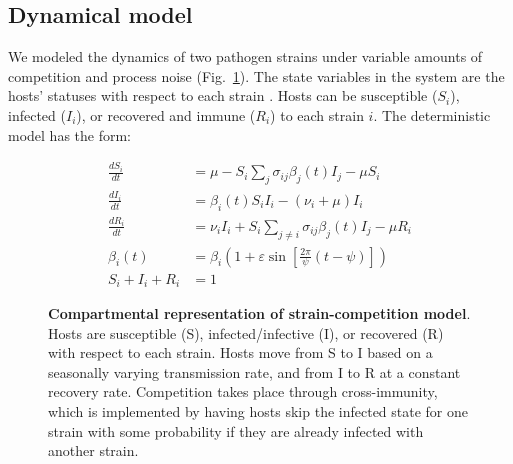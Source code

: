 \documentclass[10pt,letterpaper]{article}
\begin{document}
\subsection*{Dynamical model}
We modeled the dynamics of two pathogen strains under variable amounts of competition and process noise (Fig.~\ref{fig:compartmental}).
The state variables in the system are the hosts' statuses with respect to each strain \cite{Gog2002}. 
Hosts can be susceptible ($S_i$), infected ($I_i$), or recovered and immune ($R_i$) to each strain $i$. 
The deterministic model has the form:

\begin{align}
\frac{dS_i}{dt} &=
    \mu
    - S_i\sum\limits_{j}
    \sigma_{ij}
    \beta_j(t) 
    I_j
    - \mu S_i \\
\frac{dI_i}{dt} &= 
    \beta_i(t) S_i I_i
    - (\nu_i + \mu) I_i \\
\frac{dR_i}{dt} &=
    \nu_i I_i
    + S_i\sum\limits_{j \neq i} \sigma_{ij} \beta_j(t)  I_j
    - \mu R_i \\
\beta_i(t) &= \beta_i
    \left(
        1 + \varepsilon \sin \left[
            \frac{2\pi}{\psi} \left( t - \psi \right)
        \right]
    \right) \\
S_i + I_i + R_i &= 1
\end{align}

\begin{figure}
    \caption{\textbf{Compartmental representation of strain-competition model}.
    Hosts are susceptible (S), infected/infective (I), or recovered (R) with respect to each strain.
    Hosts move from S to I based on a seasonally varying transmission rate, and from I to R at a constant recovery rate. Competition takes place through cross-immunity, which is implemented by having hosts skip the infected state for one strain with some probability if they are already infected with another strain.
    \label{fig:compartmental}}
\end{figure}
\end{document}
